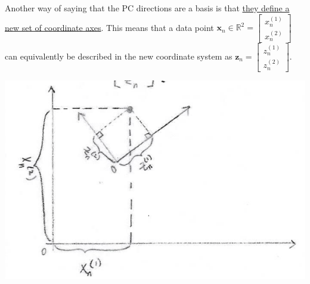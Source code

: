 \documentclass[11pt]{article}
\newcommand{\xb}{\mathbf{x}}
\newcommand{\zb}{\mathbf{z}}
\begin{document}
\begin{minipage}{0.5 \textwidth}
  Another way of saying that the PC directions are a basis is that \underline{they
  define a new set of coordinate axes}. This means that a data point $\xb_n \in
  \mathbb{R}^2 = \begin{bmatrix} x_n^{(1)} \\ x_n^{(2)} \end{bmatrix}$ can
  equivalently be described in the new coordinate system as $\zb_n =
  \begin{bmatrix} z_n^{(1)} \\ z_n^{(2)} \end{bmatrix}$.
\end{minipage}\hfill
\begin{minipage}{0.45 \textwidth}
  \begin{center}
    \includegraphics[width=\textwidth]{PCADimensions.png}
  \end{center}
\end{minipage}
\end{document}
